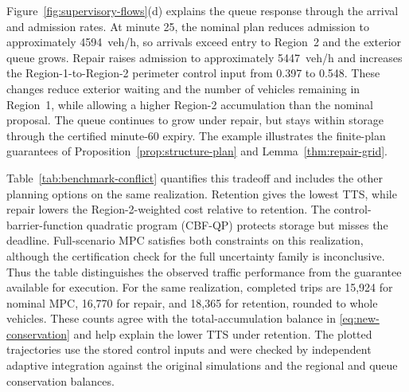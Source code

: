 Figure~\ref{fig:supervisory-flows}(d) explains the queue response through
the arrival and admission rates. At minute 25, the nominal plan reduces admission to
approximately 4594~veh/h, so arrivals exceed entry to Region~2 and the
exterior queue grows. Repair raises admission to approximately
5447~veh/h and increases the Region-1-to-Region-2 perimeter control input from
0.397 to 0.548. These changes reduce exterior waiting and the number of
vehicles remaining in Region~1, while allowing a higher Region-2
accumulation than the nominal proposal. The queue continues to grow under
repair, but stays within storage through the certified minute-60 expiry.
The example illustrates the finite-plan guarantees of
Proposition~\ref{prop:structure-plan} and Lemma~\ref{thm:repair-grid}.


Table~\ref{tab:benchmark-conflict} quantifies this tradeoff and includes
the other planning options on the same realization. Retention gives the
lowest TTS, while repair lowers the Region-2-weighted cost relative to
retention. The control-barrier-function quadratic program
(CBF-QP) protects storage but misses the deadline. Full-scenario MPC
satisfies both constraints on this realization, although the certification check
for the full uncertainty family is inconclusive. Thus the table distinguishes the
observed traffic performance from the guarantee available for execution.
For the same realization, completed trips are 15,924 for nominal MPC,
16,770 for repair, and 18,365 for retention, rounded to whole vehicles.
These counts agree with the total-accumulation balance in
\eqref{eq:new-conservation} and help explain the lower TTS under retention.
The plotted trajectories use the stored control inputs and were checked by
independent adaptive integration against the original simulations and the
regional and queue conservation balances.

